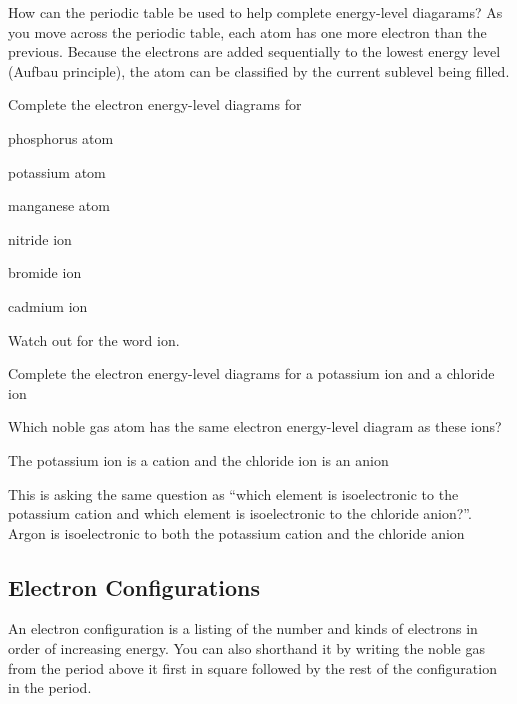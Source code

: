 \begin{sample}{How can the periodic table be used to help complete energy-level diagarams?}
    As you move across the periodic table, each atom has one more electron than the previous.
    Because the electrons are added sequentially to the lowest energy level (Aufbau principle),
    the atom can be classified by the current sublevel being filled.
\end{sample}

\begin{sample}{Complete the electron energy-level diagrams for
        \begin{enum-alph}
            \item phosphorus atom
            \item potassium atom
            \item manganese atom
            \item nitride ion
            \item bromide ion
            \item cadmium ion
        \end{enum-alph}
    }
    Watch out for the word ion.
\end{sample}

\begin{sample}{
        \begin{enum-alph}
            \item Complete the electron energy-level diagrams for a potassium ion and a chloride ion
            \item Which noble gas atom has the same electron energy-level diagram as these ions?
        \end{enum-alph}
    }
    \begin{enum-alph}
        \item The potassium ion is a cation and the chloride ion is an anion
        \item This is asking the same question as ``which element is isoelectronic to the potassium
            cation and which element is isoelectronic to the chloride anion?''. Argon is isoelectronic
            to both the potassium cation and the chloride anion
    \end{enum-alph}
\end{sample}

\subsection{Electron Configurations}
An electron configuration is a listing of the number and kinds of electrons in order of increasing energy.
You can also shorthand it by writing the noble gas from the period above it first in square
followed by the rest of the configuration in the period.

